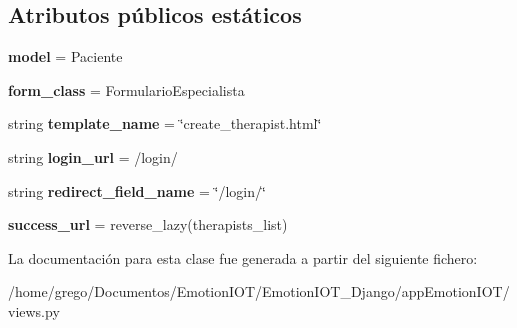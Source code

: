 \subsection*{Atributos públicos estáticos}
\begin{DoxyCompactItemize}
\item 
{\bfseries model} = Paciente\hypertarget{classappEmotionIOT_1_1views_1_1Create__therapist_af7d0a5aeb2191ba6389b6627a0e02b78}{}\label{classappEmotionIOT_1_1views_1_1Create__therapist_af7d0a5aeb2191ba6389b6627a0e02b78}

\item 
{\bfseries form\+\_\+class} = Formulario\+Especialista\hypertarget{classappEmotionIOT_1_1views_1_1Create__therapist_a358c4ac4a07c360a8290eca0d0e9fbd6}{}\label{classappEmotionIOT_1_1views_1_1Create__therapist_a358c4ac4a07c360a8290eca0d0e9fbd6}

\item 
string {\bfseries template\+\_\+name} = \char`\"{}create\+\_\+therapist.\+html\char`\"{}\hypertarget{classappEmotionIOT_1_1views_1_1Create__therapist_a684c1c53da374bea566cb530a91c5103}{}\label{classappEmotionIOT_1_1views_1_1Create__therapist_a684c1c53da374bea566cb530a91c5103}

\item 
string {\bfseries login\+\_\+url} = \textquotesingle{}/login/\textquotesingle{}\hypertarget{classappEmotionIOT_1_1views_1_1Create__therapist_a3206e13ac15c42301584a9a5426ae329}{}\label{classappEmotionIOT_1_1views_1_1Create__therapist_a3206e13ac15c42301584a9a5426ae329}

\item 
string {\bfseries redirect\+\_\+field\+\_\+name} = \char`\"{}/login/\char`\"{}\hypertarget{classappEmotionIOT_1_1views_1_1Create__therapist_a1feced164fac433b9877baa505a6ada7}{}\label{classappEmotionIOT_1_1views_1_1Create__therapist_a1feced164fac433b9877baa505a6ada7}

\item 
{\bfseries success\+\_\+url} = reverse\+\_\+lazy(\textquotesingle{}therapists\+\_\+list\textquotesingle{})\hypertarget{classappEmotionIOT_1_1views_1_1Create__therapist_a8a892c92ee63f48232ffad17c57cb164}{}\label{classappEmotionIOT_1_1views_1_1Create__therapist_a8a892c92ee63f48232ffad17c57cb164}

\end{DoxyCompactItemize}


La documentación para esta clase fue generada a partir del siguiente fichero\+:\begin{DoxyCompactItemize}
\item 
/home/grego/\+Documentos/\+Emotion\+I\+O\+T/\+Emotion\+I\+O\+T\+\_\+\+Django/app\+Emotion\+I\+O\+T/views.\+py\end{DoxyCompactItemize}
